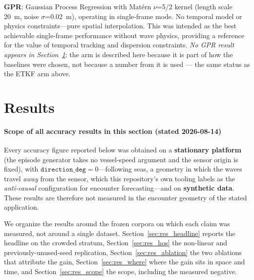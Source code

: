 \documentclass[review]{elsarticle}
\begin{document}
\textbf{GPR}: Gaussian Process Regression with Mat\'{e}rn $\nu$=5/2
kernel (length scale 20~m, noise $\sigma$=0.02~m), operating in
single-frame mode.
No temporal model or physics constraints---pure spatial interpolation.
This was intended as the best achievable single-frame performance without
wave physics, providing a reference for the value of temporal tracking
and dispersion constraints. \emph{No GPR result appears in
Section~\ref{sec:results}}: the arm is described here because it is part of how the
baselines were chosen, not because a number from it is used --- the same status as
the ETKF arm above.

\section{Results}
\label{sec:results}

\paragraph{Scope of all accuracy results in this section (stated 2026-08-14)}
Every accuracy figure reported below was obtained on a \textbf{stationary
platform} (the episode generator takes no vessel-speed argument and the sensor
origin is fixed), with \textbf{$\texttt{direction\_deg}=0$}---following seas, a
geometry in which the waves travel \emph{away} from the sensor, which this
repository's own tooling labels as the \emph{anti-causal} configuration for
encounter forecasting---and on \textbf{synthetic data}. These results are
therefore not measured in the encounter geometry of the stated application.

We organize the results around the frozen corpora on which each claim was
measured, not around a single dataset. Section~\ref{sec:res_headline} reports the headline on the
crowded stratum, Section~\ref{sec:res_hos} the non-linear and previously-unused-seed
replication, Section~\ref{sec:res_ablation} the two ablations that attribute
the gain, Section~\ref{sec:res_where} where the gain sits in space and time,
and Section~\ref{sec:res_scope} the scope, including the measured negative.
\end{document}
